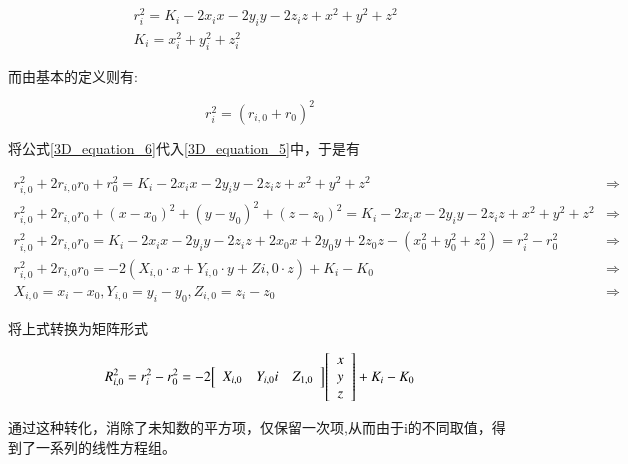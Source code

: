 \documentclass[winfonts]{njuthesis}
\begin{document}
		\begin{equation}  
		\begin{aligned}
		& r_i^2 = K_i - 2x_ix - 2y_iy - 2z_iz + x^2 + y^2 + z^2 \label{3D_equation_5}\\
		& K_i = x_i^2 + y_i^2 + z_i^2
		\end{aligned}
		\end{equation}
		
		而由基本的定义则有:
		
		\begin{equation}  
			r_i^2 = (r_{i,0}+r_0)^2 \label{3D_equation_6}
		\end{equation}
		
		将公式\ref{3D_equation_6}代入\ref{3D_equation_5}中，于是有
		
		\begin{equation}
		\begin{aligned}
			r_{i,0}^2 + 2r_{i,0}r_0 + r_0^2 = K_i - 2x_ix - 2y_iy - 2z_iz + x^2 + y^2 + z^2 & \Longrightarrow\\
			r_{i,0}^2 + 2r_{i,0}r_0 + (x-x_0)^2 + (y-y_0)^2 + (z-z_0)^2 = K_i - 2x_ix - 2y_iy - 2z_iz + x^2 + y^2 + z^2 & \Longrightarrow\\
			r_{i,0}^2 + 2r_{i,0}r_0 = K_i - 2x_ix - 2y_iy - 2z_iz + 2x_0x + 2y_0y + 2z_0z - (x_0^2 + y_0^2 + z_0^2) = r_i^2 - r_0^2 & \Longrightarrow\\
			r_{i,0}^2 + 2r_{i,0}r_0 = -2(X_{i,0}\cdot x + Y_{i,0}\cdot y + Z{i,0}\cdot z) + K_i - K_0 & \Longrightarrow\\
			X_{i,0} = x_i - x_0,  Y_{i,0} = y_i - y_0,  Z_{i,0} = z_i - z_0 & \Longrightarrow
		\end{aligned}
		\end{equation}
		
		将上式转换为矩阵形式
		
		\begin{equation}
			R_{i,0}^2 = r_i^2 - r_0^2 = -2{
			\left[ 
			\begin{array}{c c c}
				X_{i,0} & Y_{i,0} i & Z_{1,0}
			\end{array} 
			\right ]}{
			\left[ 
			\begin{array}{c}
				x\\
				y\\
				z
			\end{array}
			\right ]} + K_i - K_0
		\end{equation}
		
		通过这种转化，消除了未知数的平方项，仅保留一次项,从而由于i的不同取值，得到了一系列的线性方程组。
		
\end{document}
